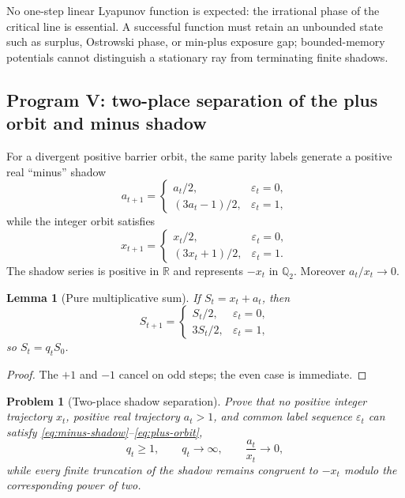 \documentclass[11pt,reqno]{amsart}
\numberwithin{equation}{section}
\newtheorem{lemma}[theorem]{Lemma}
\newtheorem{problem}[theorem]{Problem}
\theoremstyle{definition}
\theoremstyle{remark}
\newcommand{\Q}{\mathbb Q}
\newcommand{\R}{\mathbb R}
\newcommand{\eps}{\varepsilon}
\begin{document}
No one-step linear Lyapunov function is expected: the irrational phase of
the critical line is essential.  A successful function must retain an
unbounded state such as surplus, Ostrowski phase, or min-plus exposure gap;
bounded-memory potentials cannot distinguish a stationary ray from
terminating finite shadows.

\subsection{Program V: two-place separation of the plus orbit and minus shadow}

For a divergent positive barrier orbit, the same parity labels generate a
positive real ``minus'' shadow
\begin{equation}\label{eq:minus-shadow}
a_{t+1}
=
\begin{cases}
a_t/2,&\eps_t=0,\\[1mm]
(3a_t-1)/2,&\eps_t=1,
\end{cases}
\end{equation}
while the integer orbit satisfies
\begin{equation}\label{eq:plus-orbit}
x_{t+1}
=
\begin{cases}
x_t/2,&\eps_t=0,\\[1mm]
(3x_t+1)/2,&\eps_t=1.
\end{cases}
\end{equation}
The shadow series is positive in $\R$ and represents $-x_t$ in $\Q_2$.
Moreover $a_t/x_t\to0$.

\begin{lemma}[Pure multiplicative sum]\label{lem:pure-sum}
If $S_t=x_t+a_t$, then
\begin{equation}\label{eq:pure-sum-dynamics}
S_{t+1}
=
\begin{cases}
S_t/2,&\eps_t=0,\\[1mm]
3S_t/2,&\eps_t=1,
\end{cases}
\end{equation}
so $S_t=q_tS_0$.
\end{lemma}

\begin{proof}
The $+1$ and $-1$ cancel on odd steps; the even case is immediate.
\end{proof}

\begin{problem}[Two-place shadow separation]\label{prob:two-place-separation}
Prove that no positive integer trajectory $x_t$, positive real trajectory
$a_t>1$, and common label sequence $\eps_t$ can satisfy
\eqref{eq:minus-shadow}--\eqref{eq:plus-orbit},
\[
q_t\ge1,
\qquad q_t\to\infty,
\qquad \frac{a_t}{x_t}\to0,
\]
while every finite truncation of the shadow remains congruent to $-x_t$
modulo the corresponding power of two.
\end{problem}
\end{document}
